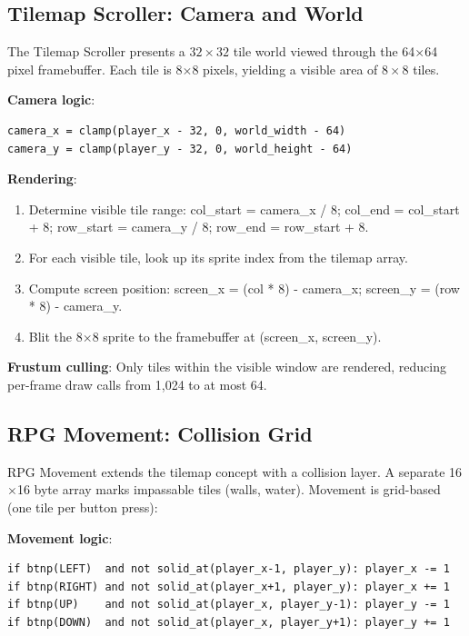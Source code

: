 \documentclass[12pt,a4paper,twoside]{book}
\theoremstyle{trinarytheorem}
\theoremstyle{trinarydefinition}
\newcommand{\code}[1]{\textsf{#1}}
\begin{document}
\subsection{Tilemap Scroller: Camera and World}

The Tilemap Scroller presents a $32 \times 32$ tile world viewed through
the 64$\times$64 pixel framebuffer. Each tile is 8$\times$8 pixels,
yielding a visible area of $8 \times 8$ tiles.

\noindent\textbf{Camera logic}:
\begin{verbatim}
camera_x = clamp(player_x - 32, 0, world_width - 64)
camera_y = clamp(player_y - 32, 0, world_height - 64)
\end{verbatim}

\noindent\textbf{Rendering}:
\begin{enumerate}
    \item Determine visible tile range:
          \code{col\_start = camera\_x / 8; col\_end = col\_start + 8};
          \code{row\_start = camera\_y / 8; row\_end = row\_start + 8}.
    \item For each visible tile, look up its sprite index from the
          tilemap array.
    \item Compute screen position: \code{screen\_x = (col * 8) - camera\_x};
          \quad\code{screen\_y = (row * 8) - camera\_y}.
    \item Blit the 8$\times$8 sprite to the framebuffer at
          \code{(screen\_x, screen\_y)}.
\end{enumerate}

\noindent\textbf{Frustum culling}: Only tiles within the visible window
are rendered, reducing per-frame draw calls from 1,024 to at most 64.

\subsection{RPG Movement: Collision Grid}

RPG Movement extends the tilemap concept with a collision layer. A
separate 16$\times$16 byte array marks impassable tiles (walls, water).
Movement is grid-based (one tile per button press):

\noindent\textbf{Movement logic}:
\begin{verbatim}
if btnp(LEFT)  and not solid_at(player_x-1, player_y): player_x -= 1
if btnp(RIGHT) and not solid_at(player_x+1, player_y): player_x += 1
if btnp(UP)    and not solid_at(player_x, player_y-1): player_y -= 1
if btnp(DOWN)  and not solid_at(player_x, player_y+1): player_y += 1
\end{verbatim}
\end{document}
